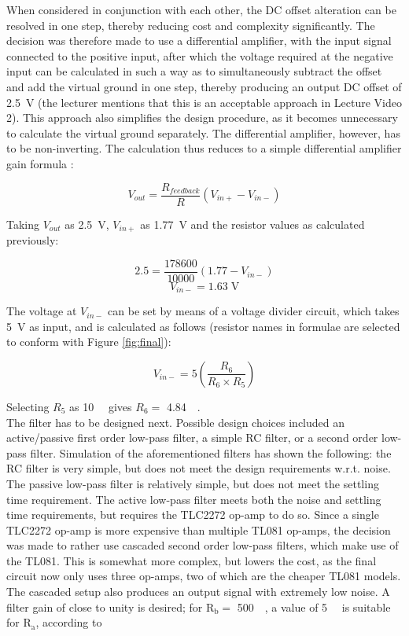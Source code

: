 When considered in conjunction with each other, the DC offset alteration can be resolved in one step, thereby reducing cost and complexity significantly. The decision was therefore made to use a differential amplifier, with the input signal connected to the positive input, after which the voltage required at the negative input can be calculated in such a way as to simultaneously subtract the offset and add the virtual ground in one step, thereby producing an output DC offset of \SI{2.5}{\volt} (the lecturer mentions that this is an acceptable approach in Lecture Video 2).  This approach also simplifies the design procedure, as it becomes unnecessary to calculate the virtual ground separately. The differential amplifier, however, has to be non-inverting. The calculation thus reduces to a simple differential amplifier gain formula \cite{opamp}: 

$$V_{out}=\frac{{R}_{feedback}}{{R}}\left({V}_{in+}-{V}_{in-}\right)$$

Taking $V_{out}$ as \SI{2.5}{\volt}, $V_{in+}$ as \SI{1.77}{\volt} and the resistor values as calculated previously:

$$2.5=\frac{178600}{10000}\left(1.77-{V}_{in-}\right)$$
$${V}_{in-} = 1.63 \; \mathrm{V}$$

The voltage at ${V}_{in-}$ can be set by means of a voltage divider circuit, which takes \SI{5}{\volt} as input, and is calculated as follows (resistor names in formulae are selected to conform with Figure \ref{fig:final}):

$${V}_{in-} = 5 (\frac{R_{6}}{R_{6}\times R_{5}})$$

Selecting $R_5$ as \SI{10}{\kilo \Omega} gives $R_6 =$ \SI{4.84}{\kilo \Omega}.\\

The filter has to be designed next. Possible design choices included an active/passive first order low-pass filter, a simple RC filter, or a second order low-pass filter. Simulation of the aforementioned filters has shown the following: the RC filter is very simple, but does not meet the design requirements w.r.t. noise. The passive low-pass filter is relatively simple, but does not meet the settling time requirement. The active low-pass filter meets both the noise and settling time requirements, but requires the TLC2272 op-amp to do so. Since a single TLC2272 op-amp is more expensive than multiple TL081 op-amps, the decision was made to rather use cascaded second order low-pass filters, which  make use of the TL081. This is somewhat more complex, but lowers the cost, as the final circuit now only uses three op-amps, two of which are the cheaper TL081 models. The cascaded setup also produces an output signal with extremely low noise.  A filter gain of close to unity is desired; for $\mathrm{R_b} = $ \SI{500}{\kilo\Omega}, a value of \SI{5}{\kilo\Omega} is suitable for $\mathrm{R_a}$, according to

